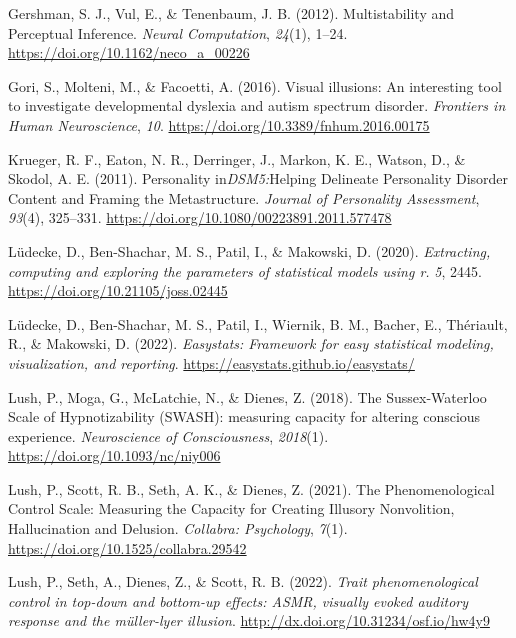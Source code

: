 \documentclass[
  man,
  floatsintext,
  longtable,
  nolmodern,
  notxfonts,
  notimes,
  colorlinks=true,linkcolor=blue,citecolor=blue,urlcolor=blue]{apa7}
\newlength{\cslhangindent}
\newenvironment{CSLReferences}[2] %
 {\begin{list}{}{%
  \setlength{\itemindent}{0pt}
  \setlength{\leftmargin}{0pt}
  \setlength{\parsep}{0pt}
  \ifodd #1
   \setlength{\leftmargin}{\cslhangindent}
   \setlength{\itemindent}{-1\cslhangindent}
  \fi
  \setlength{\itemsep}{#2\baselineskip}}}
 {\end{list}}
\begin{document}
\begin{CSLReferences}{1}{0}
Gershman, S. J., Vul, E., \& Tenenbaum, J. B. (2012). Multistability and
Perceptual Inference. \emph{Neural Computation}, \emph{24}(1), 1--24.
\url{https://doi.org/10.1162/neco_a_00226}

Gori, S., Molteni, M., \& Facoetti, A. (2016). Visual illusions: An
interesting tool to investigate developmental dyslexia and autism
spectrum disorder. \emph{Frontiers in Human Neuroscience}, \emph{10}.
\url{https://doi.org/10.3389/fnhum.2016.00175}

Krueger, R. F., Eaton, N. R., Derringer, J., Markon, K. E., Watson, D.,
\& Skodol, A. E. (2011). Personality
in{\emph{DSM{\textendash}5:}}Helping Delineate Personality Disorder
Content and Framing the Metastructure. \emph{Journal of Personality
Assessment}, \emph{93}(4), 325--331.
\url{https://doi.org/10.1080/00223891.2011.577478}

Lüdecke, D., Ben-Shachar, M. S., Patil, I., \& Makowski, D. (2020).
\emph{Extracting, computing and exploring the parameters of statistical
models using {\textbraceleft}r{\textbraceright}.} \emph{5}, 2445.
\url{https://doi.org/10.21105/joss.02445}

Lüdecke, D., Ben-Shachar, M. S., Patil, I., Wiernik, B. M., Bacher, E.,
Thériault, R., \& Makowski, D. (2022). \emph{Easystats: Framework for
easy statistical modeling, visualization, and reporting}.
\url{https://easystats.github.io/easystats/}

Lush, P., Moga, G., McLatchie, N., \& Dienes, Z. (2018). The
Sussex-Waterloo Scale of Hypnotizability (SWASH): measuring capacity for
altering conscious experience. \emph{Neuroscience of Consciousness},
\emph{2018}(1). \url{https://doi.org/10.1093/nc/niy006}

Lush, P., Scott, R. B., Seth, A. K., \& Dienes, Z. (2021). The
Phenomenological Control Scale: Measuring the Capacity for Creating
Illusory Nonvolition, Hallucination and Delusion. \emph{Collabra:
Psychology}, \emph{7}(1). \url{https://doi.org/10.1525/collabra.29542}

Lush, P., Seth, A., Dienes, Z., \& Scott, R. B. (2022). \emph{Trait
phenomenological control in top-down and bottom-up effects: ASMR,
visually evoked auditory response and the müller-lyer illusion}.
\url{http://dx.doi.org/10.31234/osf.io/hw4y9}


\end{CSLReferences}
\end{document}
